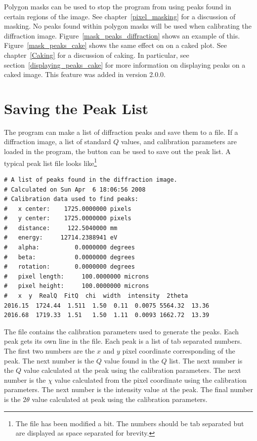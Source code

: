 Polygon masks can be used to stop the program from using peaks 
found in certain regions of the image. See chapter~\ref{pixel_masking} 
for a discussion of masking. No peaks found within polygon masks
will be used when calibrating the diffraction image.
Figure~\ref{mask_peaks_diffraction} shows an example of this. 
Figure~\ref{mask_peaks_cake} shows the same effect on on a caked 
plot. See chapter~\ref{Caking} for a discussion of caking. In 
particular, see section~\ref{displaying_peaks_cake} for more 
information on displaying peaks on a caked image. This feature was 
added in version 2.0.0.

\section{Saving the Peak List}

The program can make a list of diffraction peaks and 
save them to a file. If a diffraction image, a list of
standard $Q$ values, and calibration parameters are loaded
in the program, the  button can
be used to save out the peak list. 
A typical peak list file looks like\footnote{The file
has been modified a bit. The numbers should be tab 
separated but are displayed as space separated for brevity.}
\begin{lstlisting}[caption={Peaks.dat,basicstyle=\ttfamily\tiny}]
# A list of peaks found in the diffraction image.
# Calculated on Sun Apr  6 18:06:56 2008
# Calibration data used to find peaks:
#   x center:    1725.0000000 pixels
#   y center:    1725.0000000 pixels
#   distance:     122.5040000 mm
#   energy:     12714.2388941 eV
#   alpha:          0.0000000 degrees
#   beta:           0.0000000 degrees
#   rotation:       0.0000000 degrees
#   pixel length:     100.0000000 microns
#   pixel height:     100.0000000 microns
#   x  y  RealQ  FitQ  chi  width  intensity  2theta
2016.15  1724.44  1.511  1.50  0.11  0.0075 5564.32  13.36
2016.68  1719.33  1.51   1.50  1.11  0.0093 1662.72  13.39
\end{lstlisting}
The file contains the calibration parameters
used to generate the peaks. Each peak gets its
own line in the file. Each peak is a list of 
tab separated numbers. The first two numbers are
the $x$ and $y$ pixel coordinate corresponding of
the peak. The next number is the $Q$ value found in the 
$Q$ list. The next number is the $Q$ value calculated 
at the peak using the calibration
parameters. The next number is the $\chi$ value calculated 
from the pixel coordinate using the calibration parameters. 
The next number is the intensity value at the peak. The final
number is the $2\theta$ value calculated at peak using 
the calibration parameters.

